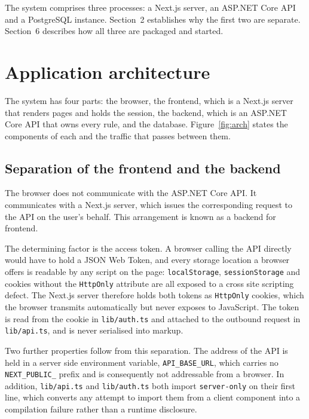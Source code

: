 \documentclass[11pt,a4paper]{article}
\newcommand{\code}[1]{\texttt{\fontsize{8.6}{10}\selectfont #1}}
\begin{document}
The system comprises three processes: a Next.js server, an ASP.NET Core API and
a PostgreSQL instance. Section~2 establishes why the first two are separate.
Section~6 describes how all three are packaged and started.

\section{Application architecture}

The system has four parts: the browser, the frontend, which is a Next.js server
that renders pages and holds the session, the backend, which is an ASP.NET Core
API that owns every rule, and the database. Figure~\ref{fig:arch} states the
components of each and the traffic that passes between them.

\subsection{Separation of the frontend and the backend}

The browser does not communicate with the ASP.NET Core API. It communicates
with a Next.js server, which issues the corresponding request to the API on the
user's behalf. This arrangement is known as a backend for frontend.

The determining factor is the access token. A browser calling the API directly
would have to hold a JSON Web Token, and every storage location a browser
offers is readable by any script on the page: \code{localStorage},
\code{sessionStorage} and cookies without the \code{HttpOnly} attribute are all
exposed to a cross site scripting defect. The Next.js server therefore holds
both tokens as \code{HttpOnly} cookies, which the browser transmits
automatically but never exposes to JavaScript. The token is read from the cookie
in \code{lib/auth.ts} and attached to the outbound request in \code{lib/api.ts},
and is never serialised into markup.

Two further properties follow from this separation. The address of the API is
held in a server side environment variable, \code{API\_BASE\_URL}, which carries
no \code{NEXT\_PUBLIC\_} prefix and is consequently not addressable from a
browser. In addition, \code{lib/api.ts} and \code{lib/auth.ts} both import
\code{server-only} on their first line, which converts any attempt to import
them from a client component into a compilation failure rather than a runtime
disclosure.
\end{document}
